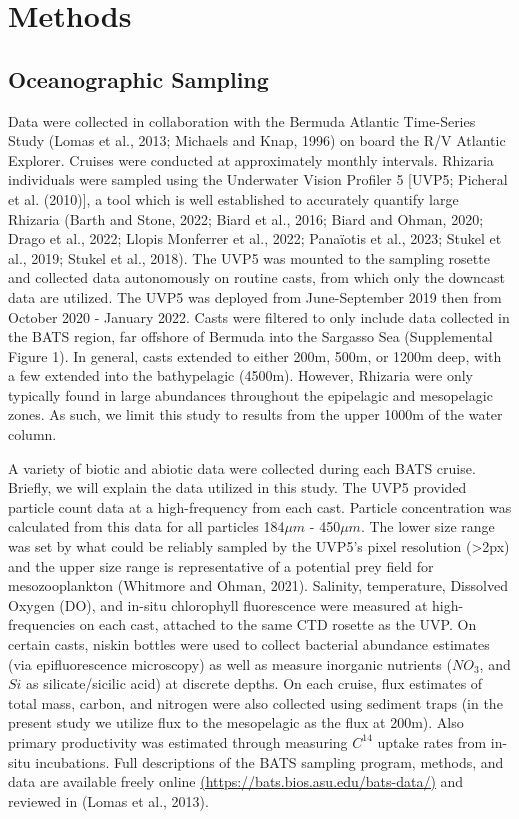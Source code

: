 \documentclass[
]{article}
\begin{document}
\hypertarget{methods}{%
\section{Methods}\label{methods}}

\hypertarget{oceanographic-sampling}{%
\subsection{Oceanographic Sampling}\label{oceanographic-sampling}}

Data were collected in collaboration with the Bermuda Atlantic
Time-Series Study (Lomas et al., 2013; Michaels and Knap, 1996) on board
the R/V Atlantic Explorer. Cruises were conducted at approximately
monthly intervals. Rhizaria individuals were sampled using the
Underwater Vision Profiler 5 {[}UVP5; Picheral et al. (2010){]}, a tool
which is well established to accurately quantify large Rhizaria (Barth
and Stone, 2022; Biard et al., 2016; Biard and Ohman, 2020; Drago et
al., 2022; Llopis Monferrer et al., 2022; Panaïotis et al., 2023; Stukel
et al., 2019; Stukel et al., 2018). The UVP5 was mounted to the sampling
rosette and collected data autonomously on routine casts, from which
only the downcast data are utilized. The UVP5 was deployed from
June-September 2019 then from October 2020 - January 2022. Casts were
filtered to only include data collected in the BATS region, far offshore
of Bermuda into the Sargasso Sea (Supplemental Figure 1). In general,
casts extended to either 200m, 500m, or 1200m deep, with a few extended
into the bathypelagic (4500m). However, Rhizaria were only typically
found in large abundances throughout the epipelagic and mesopelagic
zones. As such, we limit this study to results from the upper 1000m of
the water column.

A variety of biotic and abiotic data were collected during each BATS
cruise. Briefly, we will explain the data utilized in this study. The
UVP5 provided particle count data at a high-frequency from each cast.
Particle concentration was calculated from this data for all particles
184\(\mu m\) - 450\(\mu m\). The lower size range was set by what could
be reliably sampled by the UVP5's pixel resolution (\textgreater2px) and
the upper size range is representative of a potential prey field for
mesozooplankton (Whitmore and Ohman, 2021). Salinity, temperature,
Dissolved Oxygen (DO), and in-situ chlorophyll fluorescence were
measured at high-frequencies on each cast, attached to the same CTD
rosette as the UVP. On certain casts, niskin bottles were used to
collect bacterial abundance estimates (via epifluorescence microscopy)
as well as measure inorganic nutrients (\(NO_3\), and \(Si\) as
silicate/sicilic acid) at discrete depths. On each cruise, flux
estimates of total mass, carbon, and nitrogen were also collected using
sediment traps (in the present study we utilize flux to the mesopelagic
as the flux at 200m). Also primary productivity was estimated through
measuring \(C^{14}\) uptake rates from in-situ incubations. Full
descriptions of the BATS sampling program, methods, and data are
available freely online
\href{https://bats.bios.asu.edu/bats-data/}{(https://bats.bios.asu.edu/bats-data/)}
and reviewed in (Lomas et al., 2013).
\end{document}

